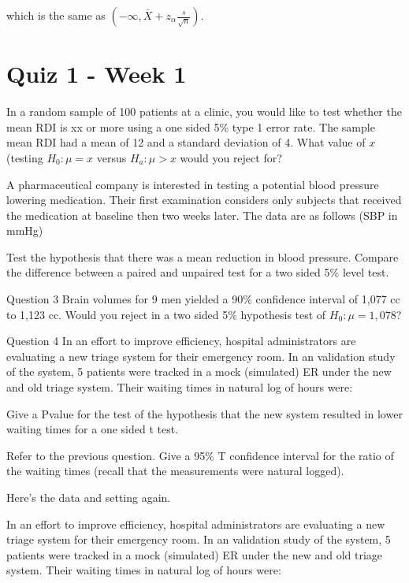 \documentclass{homework}
\begin{document}
which is the same as $(-\infty,\bar{X} + z_{\alpha}\frac{s}{\sqrt{n}})$. \\

\clearpage

\section{Quiz 1 - Week 1}

\begin{tcolorbox}[title=Question 1]
In a  random sample of 100 patients at a clinic, you would like to test whether the mean RDI is xx or more using a one sided 5\% type 1 error rate. The sample mean RDI had a mean of 12 and a standard deviation of 4. What value of $x$ (testing $H_0 : \mu = x$ versus $H_a : \mu > x$ would you reject for?
\end{tcolorbox}

\begin{tcolorbox}[title=Question 2]
A pharmaceutical company is interested in testing a potential blood pressure lowering medication. Their first examination considers only subjects that received the medication at baseline then two weeks later. The data are as follows (SBP in mmHg)

Test the hypothesis that there was a mean reduction in blood pressure. Compare the difference between a paired and unpaired test for a two sided 5\% level test.
\end{tcolorbox}

\begin{tcolorbox}[title=Question 3]
Question 3
Brain volumes for 9 men yielded a 90\% confidence interval of 1,077 cc to 1,123 cc. Would you reject in a two sided 5\% hypothesis test of $H_0: \mu=1,078$? 
\end{tcolorbox}

\begin{tcolorbox}[title=Question 4]
Question 4
In an effort to improve efficiency, hospital administrators are evaluating a new triage system for their emergency room. In an validation study of the system, 5 patients were tracked in a mock (simulated) ER under the new and old triage system. Their waiting times in natural log of hours were:

Give a Pvalue for the test of the hypothesis that the new system resulted in lower waiting times for a one sided t test.
\end{tcolorbox}

\begin{tcolorbox}[title=Question 5]
Refer to the previous question. Give a 95\% T confidence interval for the ratio of the waiting times (recall that the measurements were natural logged).

 Here's the data and setting again. 

In an effort to improve efficiency, hospital administrators are evaluating a new triage system for their emergency room. In an validation study of the system, 5 patients were tracked in a mock (simulated) ER under the new and old triage system. Their waiting times in natural log of hours were:
\end{tcolorbox}
\end{document}

